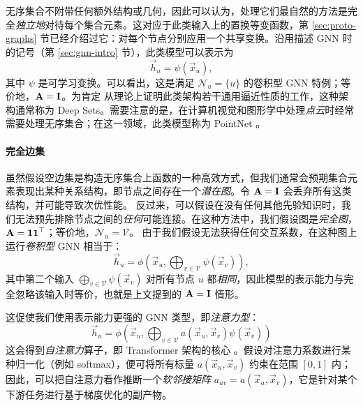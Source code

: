 无序集合不附带任何额外结构或几何，因此可以认为，处理它们最自然的方法是完全\emph{独立地}对待每个集合元素。这对应于此类输入上的置换等变函数，第 \ref{sec:proto-graphs} 节已经介绍过它：对每个节点分别应用一个共享变换。沿用描述 GNN 时的记号（第 \ref{sec:gnn-intro} 节），此类模型可以表示为
\begin{equation*}
    \vec{h}_u = \psi(\vec{x}_u),
\end{equation*}
其中 $\psi$ 是可学习变换。可以看出，这是满足 $\mathcal{N}_u = \{u\}$ 的卷积型 GNN 特例；等价地，${\bf A} = {\bf I}$。为肯定 \cite{zaheer2017deep} 从理论上证明此类架构若干通用逼近性质的工作，这种架构通常称为 Deep Sets。需要注意的是，在计算机视觉和图形学中处理\emph{点云}时经常需要处理无序集合；在这一领域，此类模型称为 PointNet \citep{qi2017pointnet}。



\paragraph*{完全边集}%

虽然假设空边集是构造无序集合上函数的一种高效方式，但我们通常会预期集合元素表现出某种关系结构，即节点之间存在一个\emph{潜在图}。令 ${\bf A} = {\bf I}$ 会丢弃所有这类结构，并可能导致次优性能。
%
反过来，可以假设在没有任何其他先验知识时，我们无法预先排除节点之间的\emph{任何}可能连接。在这种方法中，我们假设图是\emph{完全图}，${\bf A} = {\bf 1}{\bf 1}^\top$；等价地，$\mathcal{N}_u = \mathcal{V}$。
%
由于我们假设无法获得任何交互系数，在这种图上运行{\em 卷积型} GNN 相当于：
\begin{equation*}
\vec{h}_u = \phi\left(\vec{x}_u, \bigoplus_{v\in \mathcal{V}} \psi(\vec{x}_v)\right),
\end{equation*}
其中第二个输入 $\bigoplus_{v\in \mathcal{V}} \psi(\vec{x}_v)$ 对所有节点 $u$ 都\emph{相同}，因此模型的表示能力与完全忽略该输入时等价，也就是上文提到的 ${\bf A} = {\bf I}$ 情形。

这促使我们使用表示能力更强的 GNN 类型，即{\em 注意力型}：
\begin{equation}
    \vec{h}_u = \phi\left(\vec{x}_u, \bigoplus_{v\in \mathcal{V}} a(\vec{x}_u, \vec{x}_v)\psi(\vec{x}_v)\right)
\end{equation}
这会得到\emph{自注意力}算子，即 Transformer 架构的核心 \citep{vaswani2017attention}。假设对注意力系数进行某种归一化（例如 softmax），便可将所有标量 $a(\vec{x}_u, \vec{x}_v)$ 约束在范围 $[0, 1]$ 内；因此，可以把自注意力看作推断一个\emph{软邻接矩阵} $a_{uv} = a(\vec{x}_u, \vec{x}_v)$，它是针对某个下游任务进行基于梯度优化的副产物。


